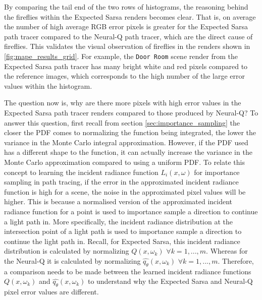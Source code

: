 \documentclass[../dissertation.tex]{subfiles}
\begin{document}
By comparing the tail end of the two rows of histograms, the reasoning behind the fireflies within the Expected Sarsa renders becomes clear. That is, on average the number of high average RGB error pixels is greater for the Expected Sarsa path tracer compared to the Neural-Q path tracer, which are the direct cause of fireflies. This validates the visual observation of fireflies in the renders shown in \ref{fig:mape_results_grid}. For example, the \verb|Door Room| scene render from the Expected Sarsa path tracer has many bright white and red pixels compared to the reference images, which corresponds to the high number of the large error values within the histogram.

The question now is, why are there more pixels with high error values in the Expected Sarsa path tracer renders compared to those produced by Neural-Q? To answer this question, first recall from section \ref{sec:importance_sampling} the closer the PDF comes to normalizing the function being integrated, the lower the variance in the Monte Carlo integral approximation. However, if the PDF used has a different shape to the function, it can actually increase the variance in the Monte Carlo approximation compared to using a uniform PDF. To relate this concept to learning the incident radiance function $L_i(x, \omega)$ for importance sampling in path tracing, if the error in the approximated incident radiance function is high for a scene, the noise in the approximated pixel values will be higher. This is because a normalised version of the approximated incident radiance function for a point is used to importance sample a direction to continue a light path in. More specifically, the incident radiance distribution at the intersection point of a light path is used to importance sample a direction to continue the light path in. Recall, for Expected Sarsa, this incident radiance distribution is calculated by normalizing $Q(x ,\omega_k)$ $\forall k = 1, ..., m$. Whereas for the Neural-Q it is calculated by normalizing $\hat{q_\theta}(x, \omega_k)$ $\forall k = 1,..., m$. Therefore, a comparison needs to be made between the learned incident radiance functions $Q(x ,\omega_k)$ and $\hat{q_\theta}(x, \omega_k)$  to understand why the Expected Sarsa and Neural-Q pixel error values are different.
\end{document}
